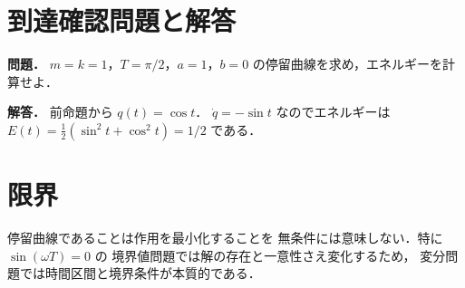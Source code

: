 \documentclass[a5paper,10pt,onecolumn]{jsarticle}
\theoremstyle{mathnotetheorem}
\begin{document}
\section*{到達確認問題と解答}
\noindent\textbf{問題．}
$m=k=1$，$T=\pi/2$，$a=1$，$b=0$
の停留曲線を求め，エネルギーを計算せよ．

\medskip\noindent\textbf{解答．}
前命題から $q(t)=\cos t$．
$\dot q=-\sin t$ なのでエネルギーは
$E(t)=\frac12(\sin^2t+\cos^2t)=1/2$ である．
\section*{限界}
停留曲線であることは作用を最小化することを
無条件には意味しない．特に $\sin(\omega T)=0$ の
境界値問題では解の存在と一意性さえ変化するため，
変分問題では時間区間と境界条件が本質的である．
\end{document}
